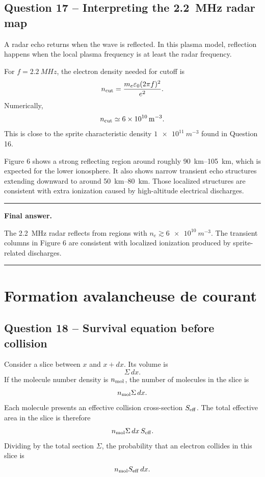 \documentclass[11pt,a4paper]{article}
\newenvironment{finalanswer}{%
  \begin{center}\begin{minipage}{0.94\linewidth}\hrule\vspace{0.45em}\textbf{Final answer. }%
}{%
  \vspace{0.45em}\hrule\end{minipage}\end{center}%
}
\begin{document}
\subsection*{Question 17 -- Interpreting the \SI{2.2}{MHz} radar map}

A radar echo returns when the wave is reflected. In this plasma model, reflection happens when the local plasma frequency is at least the radar frequency.

For $f=\SI{2.2}{MHz}$, the electron density needed for cutoff is
\[
 n_{\rm cut}=\frac{m_e\varepsilon_0(2\pi f)^2}{e^2}.
\]
Numerically,
\[
 n_{\rm cut}\simeq\SI{6e10}{m^{-3}}.
\]
This is close to the sprite characteristic density $\SI{1e11}{m^{-3}}$ found in Question 16.

Figure 6 shows a strong reflecting region around roughly \SIrange{90}{105}{km}, which is expected for the lower ionosphere. It also shows narrow transient echo structures extending downward to around \SIrange{50}{80}{km}. Those localized structures are consistent with extra ionization caused by high-altitude electrical discharges.

\begin{finalanswer}
The \SI{2.2}{MHz} radar reflects from regions with $n_e\gtrsim\SI{6e10}{m^{-3}}$. The transient columns in Figure 6 are consistent with localized ionization produced by sprite-related discharges.
\end{finalanswer}

\section{Formation avalancheuse de courant}

\subsection*{Question 18 -- Survival equation before collision}

Consider a slice between $x$ and $x+dx$. Its volume is
\[
 \Sigma\,dx.
\]
If the molecule number density is $n_{\rm mol}$, the number of molecules in the slice is
\[
 n_{\rm mol}\Sigma\,dx.
\]
Each molecule presents an effective collision cross-section $S_{\rm eff}$. The total effective area in the slice is therefore
\[
 n_{\rm mol}\Sigma\,dx\,S_{\rm eff}.
\]
Dividing by the total section $\Sigma$, the probability that an electron collides in this slice is
\[
 n_{\rm mol}S_{\rm eff}\,dx.
\]
\end{document}
